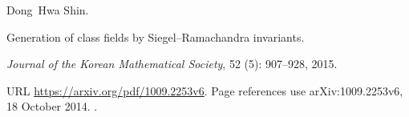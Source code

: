 Dong~Hwa Shin.

\newblock Generation of class fields by {Siegel--Ramachandra} invariants.

\newblock \emph{Journal of the Korean Mathematical Society}, 52
  (5): 907--928, 2015.

\newblock URL \url{https://arxiv.org/pdf/1009.2253v6}.
\newblock Page references use arXiv:1009.2253v6, 18 October 2014.
\newblock {}.

